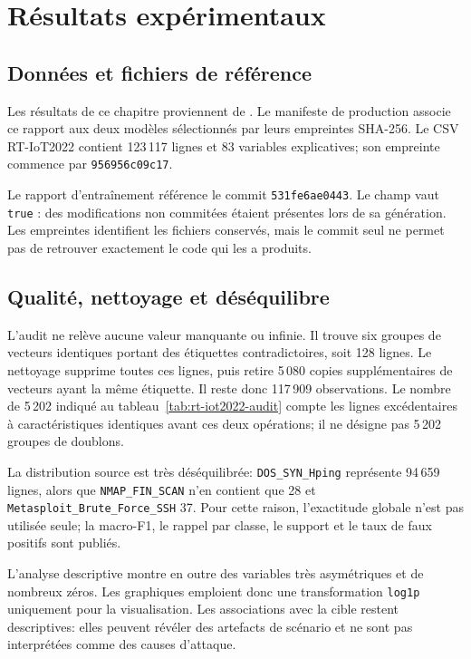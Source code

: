 \chapter{R\'esultats exp\'erimentaux}
\label{chap:resultats}

\section{Données et fichiers de référence}

Les résultats de ce chapitre proviennent de
. Le manifeste de production
associe ce rapport aux deux modèles sélectionnés par leurs empreintes SHA-256.
Le CSV RT-IoT2022 contient 123\,117 lignes et 83 variables explicatives;
son empreinte commence par \texttt{956956c09c17}.

Le rapport d'entraînement référence le commit \texttt{531fe6ae0443}.
Le champ  vaut \texttt{true} : des modifications
non commitées étaient présentes lors de sa génération. Les empreintes identifient les fichiers
conservés, mais le commit seul ne permet pas de retrouver exactement le code
qui les a produits.

\section{Qualit\'e, nettoyage et d\'es\'equilibre}

L'audit ne relève aucune valeur manquante ou infinie. Il trouve six groupes de
vecteurs identiques portant des étiquettes contradictoires, soit 128 lignes.
Le nettoyage supprime toutes ces lignes, puis retire 5\,080 copies
supplémentaires de vecteurs ayant la même étiquette. Il reste donc
117\,909 observations. Le nombre de 5\,202 indiqué au
tableau~\ref{tab:rt-iot2022-audit} compte les lignes excédentaires à
caractéristiques identiques avant ces deux opérations; il ne désigne pas
5\,202 groupes de doublons.

La distribution source est tr\`es d\'es\'equilibr\'ee: \texttt{DOS\_SYN\_Hping}
repr\'esente 94\,659 lignes, alors que \texttt{NMAP\_FIN\_SCAN} n'en contient que
28 et \texttt{Metasploit\_Brute\_Force\_SSH} 37. Pour cette raison, l'exactitude
globale n'est pas utilis\'ee seule; la macro-F1, le rappel par classe, le support et
le taux de faux positifs sont publi\'es.

L'analyse descriptive montre en outre des variables tr\`es asym\'etriques et de
nombreux z\'eros. Les graphiques emploient donc une transformation \texttt{log1p}
uniquement pour la visualisation. Les associations avec la cible restent
descriptives: elles peuvent r\'ev\'eler des artefacts de sc\'enario et ne sont pas
interpr\'et\'ees comme des causes d'attaque.

